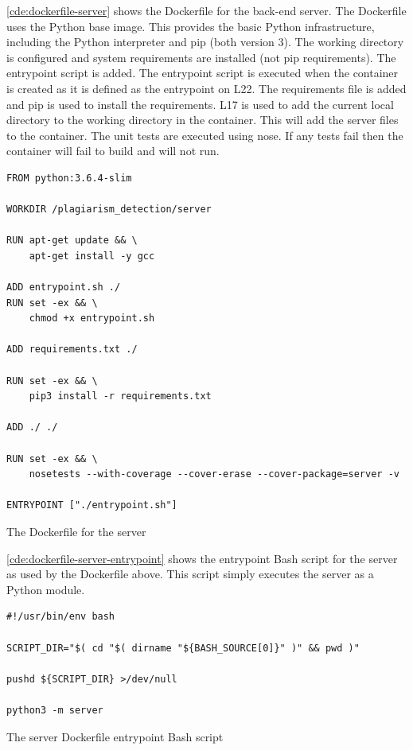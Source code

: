 \autoref{cde:dockerfile-server} shows the Dockerfile for the back-end server. The Dockerfile uses the Python base image. This provides the basic Python infrastructure, including the Python interpreter and pip (both version 3). The working directory is configured and system requirements are installed (not pip requirements). The entrypoint script is added. The entrypoint script is executed when the container is created as it is defined as the entrypoint on L22. The requirements file is added and pip is used to install the requirements. L17 is used to add the current local directory to the working directory in the container. This will add the server files to the container. The unit tests are executed using nose. If any tests fail then the container will fail to build and will not run.

\begin{code}
\begin{verbatim}
FROM python:3.6.4-slim

WORKDIR /plagiarism_detection/server

RUN apt-get update && \
    apt-get install -y gcc

ADD entrypoint.sh ./
RUN set -ex && \
    chmod +x entrypoint.sh

ADD requirements.txt ./

RUN set -ex && \
    pip3 install -r requirements.txt

ADD ./ ./

RUN set -ex && \
    nosetests --with-coverage --cover-erase --cover-package=server -v

ENTRYPOINT ["./entrypoint.sh"]
\end{verbatim}
\caption{The Dockerfile for the server}
\label{cde:dockerfile-server}
\end{code}

\autoref{cde:dockerfile-server-entrypoint} shows the entrypoint Bash script for the server as used by the Dockerfile above. This script simply executes the server as a Python module.

\begin{code}
\begin{verbatim}
#!/usr/bin/env bash

SCRIPT_DIR="$( cd "$( dirname "${BASH_SOURCE[0]}" )" && pwd )"

pushd ${SCRIPT_DIR} >/dev/null

python3 -m server
\end{verbatim}
\caption{The server Dockerfile entrypoint Bash script}
\label{cde:dockerfile-server-entrypoint}
\end{code}
